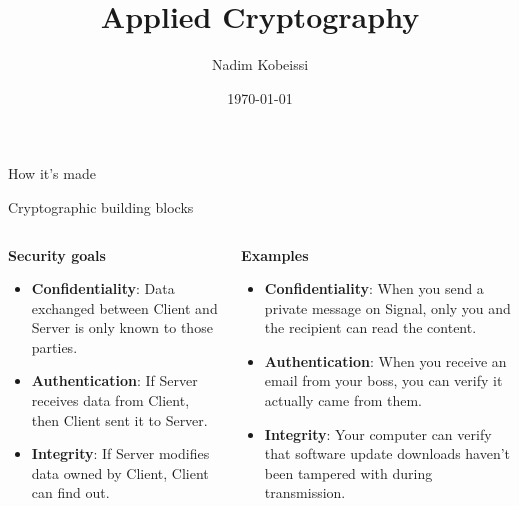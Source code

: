 \documentclass[aspectratio=169, lualatex, handout]{beamer}
\title{Applied Cryptography}
\author{Nadim Kobeissi}
\institute{American University of Beirut}
\date{\today}
\begin{document}
\begin{frame}[plain]
	\titlepage
\end{frame}

\begin{frame}{How it's made}
\end{frame}

\begin{frame}{Cryptographic building blocks}
	\begin{columns}[c]
		\begin{column}{0.5\textwidth}
			\textbf{Security goals}
			\begin{itemize}[<+->]
				\item \textbf{Confidentiality}: Data exchanged between Client and Server
				      is only known to those parties.
				\item \textbf{Authentication}: If Server receives data from Client,
				      then Client sent it to Server.
				\item \textbf{Integrity}: If Server modifies data owned by Client,
				      Client can find out.
			\end{itemize}
		\end{column}

		\begin{column}{0.5\textwidth}
			\textbf{Examples}
			\begin{itemize}[<+->]
				\item \textbf{Confidentiality}: When you send a private message on Signal,
				      only you and the recipient can read the content.
				\item \textbf{Authentication}: When you receive an email from your boss,
				      you can verify it actually came from them.
				\item \textbf{Integrity}: Your computer can verify that software update
				      downloads haven't been tampered with during transmission.
			\end{itemize}
		\end{column}
	\end{columns}
\end{frame}
\end{document}
